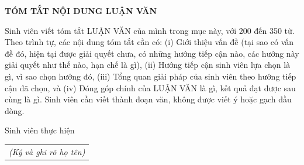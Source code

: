 \documentclass[../LuanVan.tex]{subfiles}
\begin{document}
\begin{center}
    \Large{\textbf{TÓM TẮT NỘI DUNG LUẬN VĂN}}\\
\end{center}
\vspace{1cm}
Sinh viên viết tóm tắt LUẬN VĂN của mình trong mục này, với 200 đến 350 từ. Theo trình tự, các nội dung tóm tắt cần có: (i) Giới thiệu vấn đề (tại sao có vấn đề đó, hiện tại được giải quyết chưa, có những hướng tiếp cận nào, các hướng này giải quyết như thế nào, hạn chế là gì), (ii) Hướng tiếp cận sinh viên lựa chọn là gì, vì sao chọn hướng đó, (iii) Tổng quan giải pháp của sinh viên theo hướng tiếp cận đã chọn, và (iv) Đóng góp chính của LUẬN VĂN là gì, kết quả đạt được sau cùng là gì. Sinh viên cần viết thành đoạn văn, không được viết ý hoặc gạch đầu dòng.
\begin{flushright}
Sinh viên thực hiện\\
\begin{tabular}{@{}c@{}}
\textit{(Ký và ghi rõ họ tên)}
\end{tabular}
\end{flushright}
\end{document}
